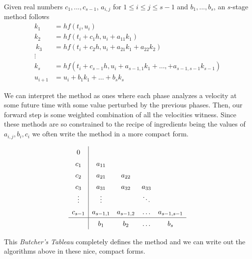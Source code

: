 \documentclass[11pt]{article}
\begin{document}
\begin{definition}
Given real numbers $c_1, ..., c_{s-1}$, $a_{i,j}$ for $1 \leq i \leq j \leq s-1$ and $b_1, ..., b_s$, an $s$-stage method follows
    \begin{align*}
    k_1 &= hf(t_i, u_i)\\
    k_2 &= hf(t_i + c_1h, u_i + a_{11}k_1)\\\
    k_3 &= hf(t_i + c_2h, u_i + a_{21}k_1+a_{22}k_2)\\
     \vdots \\
     k_s &= hf(t_i + c_{s-1}h, u_i + a_{s-1, 1}k_1 + \dots, + a_{s-1,s-1}k_{s-1})\\
     u_{i+1} &= u_i + b_1k_1 + \dots + b_sk_s
\end{align*}

\end{definition}
We can interpret the method as ones where each phase analyzes a velocity at some future time with some value perturbed by the previous phases. Then, our forward step is some weighted combination of all the velocities witness. Since these methods are so constrained to the recipe of ingredients being the values of $a_{i,j}, b_i, c_i$ we often write the method in a more compact form. 


$$
\renewcommand{\arraystretch}{1.4}
\begin{array}{c|cccc}
  0         &           &           &           &           \\
  c_1       & a_{11}    &           &           &           \\
  c_2       & a_{21}    & a_{22}    &           &           \\
  c_3       & a_{31}    & a_{32}    & a_{33}    &           \\
  \vdots & \vdots & & \ddots &\\
  c_{s-1} & a_{s-1, 1} & a_{s-1, 2} & \dots & a_{s-1, s-1}\\
  \hline
            & b_1       & b_2       & \dots       & b_s       \\
\end{array}
$$

This \textit{Butcher's Tableau} completely defines the method and we can write out the algorithms above in these nice, compact forms. 
\end{document}
